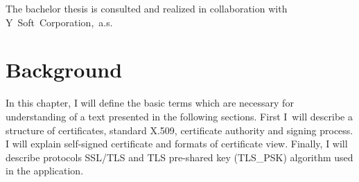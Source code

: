 \documentclass[
  12pt, 
  digital, %
  notable,   %
  nolof,     %
  nolot,     %
]{fithesis3}
\begin{document}
The bachelor thesis is consulted and realized in collaboration with Y~Soft~Corporation,~a.s.


\chapter{Background}
In this chapter, I will define the basic terms which are necessary for understanding of a 
text presented in the following sections. First I~will describe a structure of certificates, 
standard X.509, certificate authority and signing process. I will explain self-signed certificate 
and formats of certificate view. Finally, I will describe protocols SSL/TLS and TLS pre-shared key 
(TLS\_PSK) algorithm used in the application.

\end{document}
